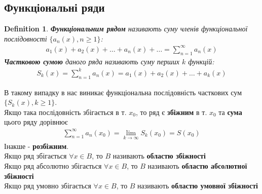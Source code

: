 \documentclass[a4paper, 10pt]{article}
\def\huge{\displaystyle}
\theoremstyle{theoremdd}
\theoremstyle{theoremdd}
\newtheorem{definition}[theorem]{Definition}
\theoremstyle{theoremdd}
\theoremstyle{theoremdd}
\theoremstyle{theoremdd}
\theoremstyle{theoremdd}
\theoremstyle{theoremdd}
\theoremstyle{theoremdd}
\begin{document}
\subsection{Функціональні ряди}
\begin{definition}
\textbf{Функціональним рядом} називають суму членів функціональної послідовності $\{a_n(x), n \geq 1\}$:
\begin{align*}
a_1(x) + a_2(x) + \dots + a_n(x) + \dots = \huge \sum_{n=1}^\infty a_n(x)
\end{align*}
\textbf{Частковою сумою} даного ряда називають суму перших $k$ функцій:
\begin{align*}
S_k(x) = \sum_{n=1}^k a_n(x) = a_1(x) + a_2(x) + \dots + a_k(x)
\end{align*}
\end{definition}

В такому випадку в нас виникає функціональна послідовність часткових сум $\{S_k(x), k \geq 1\}$.\\
Якщо така послідовність збігається в т. $x_0$, то ряд є \textbf{збіжним} в т. $x_0$ та \textbf{сума} цього ряду дорівнює
\begin{align*}
\sum_{n=1}^\infty a_n(x_0) = \lim_{k \to \infty} S_k(x_0) = S(x_0)
\end{align*}
Інакше - \textbf{розбіжним}.\\
Якщо ряд збігається $\forall x \in B$, то $B$ називають \textbf{областю збіжності}
\bigskip \\
Якщо ряд абсолютно збігається $\forall x \in B$, то $B$ називають \textbf{областю абсолютної збіжності}
\bigskip \\
Якщо ряд умовно збігається $\forall x \in B$, то $B$ називають \textbf{областю умовної збіжності}
\end{document}
